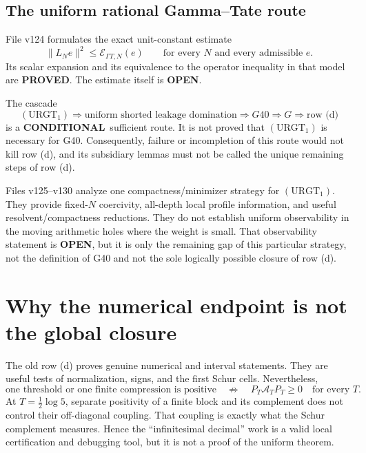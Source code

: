 \documentclass[11pt]{article}
\newcommand{\PROVED}{\textcolor{green!45!black}{\textbf{PROVED}}}
\newcommand{\OPEN}{\textcolor{red!70!black}{\textbf{OPEN}}}
\newcommand{\CONDITIONAL}{\textcolor{blue!65!black}{\textbf{CONDITIONAL}}}
\begin{document}
\subsection{The uniform rational Gamma--Tate route}

File v124 formulates the exact unit-constant estimate
\begin{equation}
 \|L_Ne\|^2\leq \mathcal E_{\Gamma T,N}(e)
 \qquad\text{for every }N\text{ and every admissible }e.
 \tag{URGT_1}
\end{equation}
Its scalar expansion and its equivalence to the operator inequality in that model
are \PROVED.  The estimate itself is \OPEN.

The cascade
\begin{equation}
 (\mathrm{URGT}_1)
 \Longrightarrow
 \text{uniform shorted leakage domination}
 \Longrightarrow G40
 \Longrightarrow G
 \Longrightarrow \text{row (d)}
 \tag{C1}
\end{equation}
is a \CONDITIONAL\ sufficient route.  It is not proved that
\((\mathrm{URGT}_1)\) is necessary for G40.  Consequently, failure or incompletion
of this route would not kill row (d), and its subsidiary lemmas must not be called
the unique remaining steps of row (d).

Files v125--v130 analyze one compactness/minimizer strategy for
\((\mathrm{URGT}_1)\).  They provide fixed-\(N\) coercivity, all-depth local profile
information, and useful resolvent/compactness reductions.  They do not establish
uniform observability in the moving arithmetic holes where the weight is small.
That observability statement is \OPEN, but it is only the remaining gap of this
particular strategy, not the definition of G40 and not the sole logically possible
closure of row (d).

\section{Why the numerical endpoint is not the global closure}

The old row (d) proves genuine numerical and interval statements.  They are useful
tests of normalization, signs, and the first Schur cells.  Nevertheless,
\begin{equation}
 \text{one threshold or one finite compression is positive}
 \quad\not\Longrightarrow\quad
 P_T\mathcal A_TP_T\geq0\quad\text{for every }T.
 \tag{N1}
\end{equation}
At \(T=\tfrac12\log5\), separate positivity of a finite block and its complement
does not control their off-diagonal coupling.  That coupling is exactly what the
Schur complement measures.  Hence the ``infinitesimal decimal'' work is a valid
local certification and debugging tool, but it is not a proof of the uniform
theorem.
\end{document}
